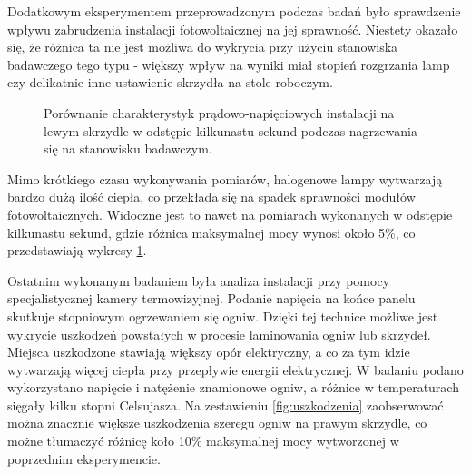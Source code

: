 \documentclass[12pt, a4paper]{article}
\begin{document}
Dodatkowym eksperymentem przeprowadzonym podczas badań było sprawdzenie wpływu zabrudzenia instalacji fotowoltaicznej na jej sprawność. Niestety okazało się, że różnica ta nie jest możliwa do wykrycia przy użyciu stanowiska badawczego tego typu - większy wpływ na wyniki miał stopień rozgrzania lamp czy delikatnie inne ustawienie skrzydła na stole roboczym.

\begin{figure}[ht]
    \centering
    \qquad
    \caption{Porównanie charakterystyk prądowo-napięciowych instalacji na lewym skrzydle w odstępie kilkunastu sekund podczas nagrzewania się na stanowisku badawczym.}
    \label{fig:cieple}
\end{figure}

Mimo krótkiego czasu wykonywania pomiarów, halogenowe lampy wytwarzają bardzo dużą ilość ciepła, co przekłada się na spadek sprawności modułów fotowoltaicznych. Widoczne jest to nawet na pomiarach wykonanych w odstępie kilkunastu sekund, gdzie różnica maksymalnej mocy wynosi około 5\%, co przedstawiają wykresy \ref{fig:cieple}. 

Ostatnim wykonanym badaniem była analiza instalacji przy pomocy specjalistycznej kamery termowizyjnej. Podanie napięcia na końce panelu skutkuje stopniowym ogrzewaniem się ogniw. Dzięki tej technice możliwe jest wykrycie uszkodzeń powstałych w procesie laminowania ogniw lub skrzydeł. Miejsca uszkodzone stawiają większy opór elektryczny, a co za tym idzie wytwarzają więcej ciepła przy przepływie energii elektrycznej. W badaniu podano wykorzystano napięcie i natężenie znamionowe ogniw, a różnice w temperaturach sięgały kilku stopni Celsujasza. Na zestawieniu \ref{fig:uszkodzenia} zaobserwować można znacznie większe uszkodzenia szeregu ogniw na prawym skrzydle, co możne tłumaczyć różnicę koło 10\% maksymalnej mocy wytworzonej w poprzednim eksperymencie.
\end{document}
